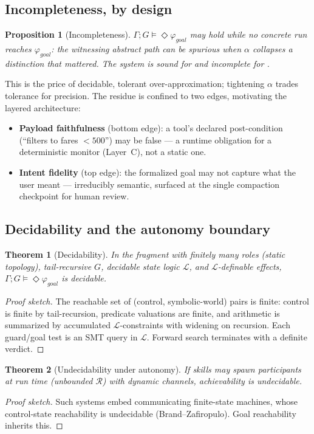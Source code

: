 \documentclass[11pt]{article}
\theoremstyle{plain}
\newtheorem{theorem}{Theorem}
\newtheorem{proposition}{Proposition}
\theoremstyle{definition}
\newcommand{\gphi}{\varphi_{\mathit{goal}}}
\newcommand{\achbox}{\vDash\Diamond}
\begin{document}
\subsection{Incompleteness, by design}
\begin{proposition}[Incompleteness]\label{prop:inc}
$\Gamma;G\achbox\gphi$ may hold while no concrete run reaches $\gphi$: the
witnessing abstract path can be spurious when $\alpha$ collapses a distinction
that mattered. The system is \emph{sound for  and incomplete for
}.
\end{proposition}
This is the price of decidable, tolerant over-approximation; tightening $\alpha$
trades tolerance for precision. The residue is confined to two edges, motivating
the layered architecture:
\begin{itemize}\setlength{\itemsep}{1pt}
\item \textbf{Payload faithfulness} (bottom edge): a tool's declared
post-condition (``filters to fares $<500$'') may be false --- a runtime obligation
for a deterministic monitor (Layer~C), not a static one.
\item \textbf{Intent fidelity} (top edge): the formalized goal may not capture what
the user meant --- irreducibly semantic, surfaced at the single compaction
checkpoint for human review.
\end{itemize}

\subsection{Decidability and the autonomy boundary}
\begin{theorem}[Decidability]\label{thm:dec}
In the fragment with finitely many roles (static topology), tail-recursive $G$,
decidable state logic $\mathcal L$, and $\mathcal L$-definable effects,
$\Gamma;G\achbox\gphi$ is decidable.
\end{theorem}
\begin{proof}[Proof sketch]
The reachable set of (control, symbolic-world) pairs is finite: control is finite
by tail-recursion, predicate valuations are finite, and arithmetic is summarized by
accumulated $\mathcal L$-constraints with widening on recursion. Each guard/goal
test is an SMT query in $\mathcal L$. Forward search terminates with a definite
verdict.
\end{proof}
\begin{theorem}[Undecidability under autonomy]\label{thm:undec}
If skills may spawn participants at run time (unbounded $\mathcal R$) with dynamic
channels, achievability is undecidable.
\end{theorem}
\begin{proof}[Proof sketch]
Such systems embed communicating finite-state machines, whose control-state
reachability is undecidable (Brand--Zafiropulo). Goal reachability inherits this.
\end{proof}
\end{document}
